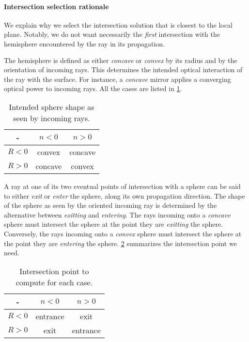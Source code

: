 \paragraph{Intersection selection rationale}
\label{sec:sphere-intersection-selection}

We explain why we select the intersection solution that is closest to
the local plane. Notably, we do not want necessarily the \emph{first}
intersection with the hemisphere encountered by the ray in its propagation.

The hemisphere is defined as either \emph{concave} or \emph{convex} by its
radius and by the orientation of incoming rays. This determines
the intended optical interaction of the ray with the surface.  For instance, a
\emph{concave} mirror applies a converging optical power to incoming rays. All
the cases are listed in \cref{tab:sphere-definition-cases}.

\begin{table} \caption{\label{tab:sphere-definition-cases} Intended sphere
shape as seen by incoming rays.}
\begin{tabular}{| c | c | c |} \hline
-       & $n < 0$ & $n > 0$ \\ \hline
$R < 0$ & convex  & concave \\ \hline
$R > 0$ & concave & convex  \\
\hline \end{tabular} \end{table}

A ray at one of its two eventual points of intersection with a sphere can be
said to either \emph{exit} or \emph{enter} the sphere, along its own
propagation direction. The shape of the sphere as seen by the oriented incoming
ray is determined by the alternative between \emph{exitting} and
\emph{entering}.  The rays incoming onto a \emph{concave} sphere must intersect
the sphere at the point they are \emph{exitting} the sphere.  Conversely, the
rays incoming onto a \emph{convex} sphere must intersect the sphere at the
point they are \emph{entering} the sphere. \cref{tab:sphere-exit-entrance}
summarizes the intersection point we need.

\begin{table} \caption{\label{tab:sphere-exit-entrance} Intersection point
to compute for each case.}
\begin{tabular}{| c | c | c |} \hline
-       & $n < 0$   & $n > 0$  \\ \hline
$R < 0$ & entrance  & exit     \\ \hline
$R > 0$ & exit      & entrance \\
\hline \end{tabular} \end{table}

